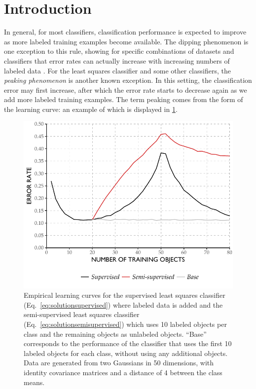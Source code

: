 \documentclass[twoside]{memoir}\usepackage[]{graphicx}\usepackage{xcolor}
\makeatletter
\def\maxwidth{ %
  \ifdim\Gin@nat@width>\linewidth
    \linewidth
  \else
    \Gin@nat@width
  \fi
}
\newenvironment{knitrout}{}{} %
\renewcommand{\cite}{\citep}
\makeatother
\begin{document}
\section{Introduction}
In general, for most classifiers, classification performance is expected to improve as more labeled training examples become available. The dipping phenomenon is one exception to this rule, showing for specific combinations of datasets and classifiers that error rates can actually increase with increasing numbers of labeled data \cite{Loog2012}.  For the least squares classifier and some other classifiers, the \emph{peaking phenomenon} is another known exception. In this setting, the classification error may first increase, after which the error rate starts to decrease again as we add more labeled training examples. The term peaking comes from the form of the learning curve: an example of which is displayed in \cref{fig:peaking}. 

\begin{knitrout}
\color{fgcolor}\begin{figure}
\includegraphics[width=\maxwidth]{figure/peaking-1} \caption{Empirical learning curves for the supervised least squares classifier (Eq.~\eqref{eq:solutionsupervised}) where labeled data is added and the semi-supervised least squares classifier (Eq.~\eqref{eq:solutionsemisupervised}) which uses 10 labeled objects per class and the remaining objects as unlabeled objects. ``Base'' corresponds to the performance of the classifier that uses the first 10 labeled objects for each class, without using any additional objects. Data are generated from two Gaussians in 50 dimensions, with identity covariance matrices and a distance of 4 between the class means.}\label{fig:peaking}
\end{figure}


\end{knitrout}
\end{document}
